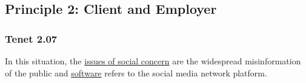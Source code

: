 
\subsection{Principle 2: Client and Employer}

\subsubsection{Tenet 2.07}


In this situation, the \ul{issues of social concern} are the widespread misinformation of the public and \ul{software} refers to the social media network platform.


